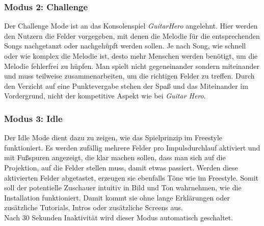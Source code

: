 \subsubsection{Modus 2: Challenge}
Der Challenge Mode ist an das Konsolenspiel \textit{GuitarHero} angelehnt. Hier werden den Nutzern die Felder vorgegeben, mit denen die Melodie für die entsprechenden Songs nachgetanzt oder nachgehüpft werden sollen. Je nach Song, wie schnell oder wie komplex die Melodie ist, desto mehr Menschen werden benötigt, um die Melodie fehlerfrei zu hüpfen. Man spielt nicht gegeneinander sondern miteinander und muss teilweise zusammenarbeiten, um die richtigen Felder zu treffen. Durch den Verzicht auf eine Punktevergabe stehen der Spaß und das Miteinander im Vordergrund, nicht der kompetitive Aspekt wie bei \textit{Guitar Hero}.

\subsubsection{Modus 3: Idle}
Der Idle Mode dient dazu zu zeigen, wie das Spielprinzip im Freestyle funktioniert. Es werden zufällig mehrere Felder pro Impulsdurchlauf aktiviert und mit Fußspuren angezeigt, die klar machen sollen, dass man sich auf die Projektion, auf die Felder stellen muss, damit etwas passiert. Werden diese aktivierten Felder abgetastet, erzeugen sie ebenfalls Töne wie im Freestyle. Somit soll der potentielle Zuschauer intuitiv in Bild und Ton wahrnehmen, wie die Installation funktioniert. Damit kommt sie ohne lange Erklärungen oder zusätzliche Tutorials, Intros oder zusätzliche Screens aus.\\
Nach 30 Sekunden Inaktivität wird dieser Modus automatisch geschaltet.






